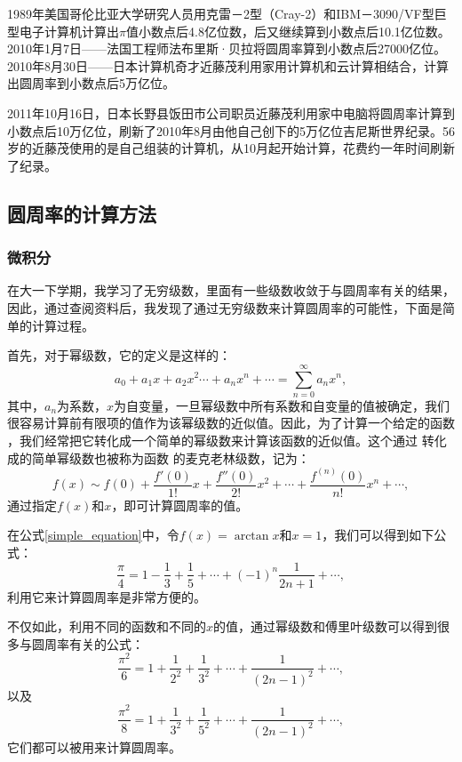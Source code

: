 \documentclass[12pt,a4paper]{ctexart}
\begin{document}
	1989年美国哥伦比亚大学研究人员用克雷－2型（Cray-2）和IBM－3090/VF型巨型电子计算机计算出$\pi$值小数点后4.8亿位数，后又继续算到小数点后10.1亿位数。2010年1月7日——法国工程师法布里斯·贝拉将圆周率算到小数点后27000亿位。2010年8月30日——日本计算机奇才近藤茂利用家用计算机和云计算相结合，计算出圆周率到小数点后5万亿位\cite{RN21}。
	
	2011年10月16日，日本长野县饭田市公司职员近藤茂利用家中电脑将圆周率计算到小数点后10万亿位，刷新了2010年8月由他自己创下的5万亿位吉尼斯世界纪录。56岁的近藤茂使用的是自己组装的计算机，从10月起开始计算，花费约一年时间刷新了纪录\cite{RN21}。
	\subsection{圆周率的计算方法}
	\subsubsection{微积分}
	在大一下学期，我学习了无穷级数，里面有一些级数收敛于与圆周率有关的结果，因此，通过查阅资料后，我发现了通过无穷级数来计算圆周率的可能性，下面是简单的计算过程。
	
	首先，对于幂级数，它的定义是这样的：
	\begin{equation}{{a}_{0}}+{{a}_{1}}x+{{a}_{2}}{{x}^{2}}\cdots +{{a}_{n}}{{x}^{n}}+\cdots =\sum\limits_{n=0}^{\infty }{{{a}_{n}}{{x}^{n}}},\end{equation}
	其中，$a_n$为系数，$x$为自变量，一旦幂级数中所有系数和自变量的值被确定，我们很容易计算前有限项的值作为该幂级数的近似值。因此，为了计算一个给定的函数 ，我们经常把它转化成一个简单的幂级数来计算该函数的近似值。这个通过 转化成的简单幂级数也被称为函数 的麦克老林级数，记为：
	\begin{equation}\label{simple_equation}f(x)\sim f(0)+\frac{{f}'(0)}{1!}x+\frac{{f}''(0)}{2!}{{x}^{2}}+\cdots +\frac{{{f}^{(n)}}(0)}{n!}{{x}^{n}}+\cdots,\end{equation}
	通过指定$f(x)$和$x$，即可计算圆周率的值。
	
	在公式\ref{simple_equation}中，令$f(x)=\arctan{x}$和$x=1$，我们可以得到如下公式：
	\begin{equation}\frac{\pi }{4}=1-\frac{1}{3}+\frac{1}{5}+\cdots +{{(-1)}^{n}}\frac{1}{2n+1}+\cdots ,\end{equation}
	利用它来计算圆周率是非常方便的。
	
	不仅如此，利用不同的函数和不同的$x$的值，通过幂级数和傅里叶级数可以得到很多与圆周率有关的公式：
	\begin{equation}\frac{{{\pi }^{2}}}{6}=1+\frac{1}{{{2}^{2}}}+\frac{1}{{{3}^{2}}}+\cdots +\frac{1}{{{(2n-1)}^{2}}}+\cdots ,\end{equation}
	以及
	\begin{equation}\frac{{{\pi }^{2}}}{8}=1+\frac{1}{{{3}^{2}}}+\frac{1}{{{5}^{2}}}+\cdots +\frac{1}{{{(2n-1)}^{2}}}+\cdots ,\end{equation}
	它们都可以被用来计算圆周率\cite{RN20}。
\end{document}

